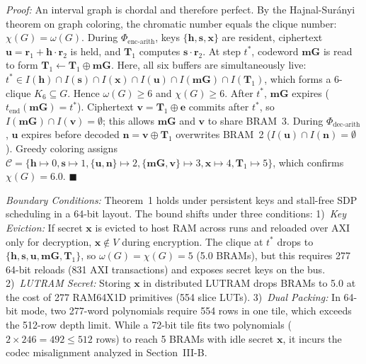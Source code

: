 \documentclass[journal]{IEEEtran}
\begin{document}
\textit{Proof:} An interval graph is chordal and therefore perfect. By the Hajnal-Sur\'anyi theorem on graph coloring, the chromatic number equals the clique number: $\chi(G) = \omega(G)$. During $\Phi_{\text{enc-arith}}$, keys $\{\mathbf{h}, \mathbf{s}, \mathbf{x}\}$ are resident, ciphertext $\mathbf{u} = \mathbf{r}_1 + \mathbf{h} \cdot \mathbf{r}_2$ is held, and $\mathbf{T}_1$ computes $\mathbf{s} \cdot \mathbf{r}_2$. At step $t^*$, codeword $\mathbf{mG}$ is read to form $\mathbf{T}_1 \leftarrow \mathbf{T}_1 \oplus \mathbf{mG}$. Here, all six buffers are simultaneously live: $t^* \in I(\mathbf{h}) \cap I(\mathbf{s}) \cap I(\mathbf{x}) \cap I(\mathbf{u}) \cap I(\mathbf{mG}) \cap I(\mathbf{T}_1)$, which forms a 6-clique $K_6 \subseteq G$. Hence $\omega(G) \ge 6$ and $\chi(G) \ge 6$. After $t^*$, $\mathbf{mG}$ expires ($t_{\text{end}}(\mathbf{mG}) = t^*$). Ciphertext $\mathbf{v} = \mathbf{T}_1 \oplus \mathbf{e}$ commits after $t^*$, so $I(\mathbf{mG}) \cap I(\mathbf{v}) = \emptyset$; this allows $\mathbf{mG}$ and $\mathbf{v}$ to share BRAM~3. During $\Phi_{\text{dec-arith}}$, $\mathbf{u}$ expires before decoded $\mathbf{n} = \mathbf{v} \oplus \mathbf{T}_1$ overwrites BRAM~2 ($I(\mathbf{u}) \cap I(\mathbf{n}) = \emptyset$). Greedy coloring assigns $\mathcal{C} = \{\mathbf{h} \mapsto 0, \mathbf{s} \mapsto 1, \{\mathbf{u}, \mathbf{n}\} \mapsto 2, \{\mathbf{mG}, \mathbf{v}\} \mapsto 3, \mathbf{x} \mapsto 4, \mathbf{T}_1 \mapsto 5\}$, which confirms $\chi(G) = 6.0$. \hfill $\blacksquare$

\textit{Boundary Conditions:} Theorem~1 holds under persistent keys and stall-free SDP scheduling in a 64-bit layout. The bound shifts under three conditions: 1)~\textit{Key Eviction:} If secret $\mathbf{x}$ is evicted to host RAM across runs and reloaded over AXI only for decryption, $\mathbf{x} \notin V$ during encryption. The clique at $t^*$ drops to $\{\mathbf{h}, \mathbf{s}, \mathbf{u}, \mathbf{mG}, \mathbf{T}_1\}$, so $\omega(G) = \chi(G) = 5$ (5.0 BRAMs), but this requires 277 64-bit reloads (831 AXI transactions) and exposes secret keys on the bus. 2)~\textit{LUTRAM Secret:} Storing $\mathbf{x}$ in distributed LUTRAM drops BRAMs to 5.0 at the cost of 277 RAM64X1D primitives (554 slice LUTs). 3)~\textit{Dual Packing:} In 64-bit mode, two 277-word polynomials require 554 rows in one tile, which exceeds the 512-row depth limit. While a 72-bit tile fits two polynomials ($2 \times 246 = 492 \le 512$ rows) to reach 5 BRAMs with idle secret $\mathbf{x}$, it incurs the codec misalignment analyzed in Section~III-B.
\end{document}
